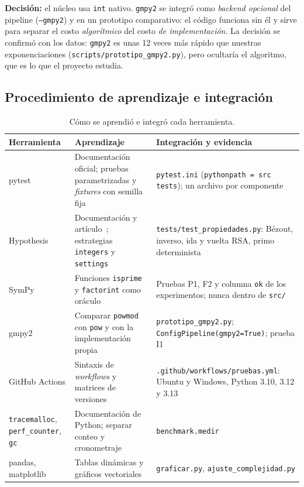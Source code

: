 \noindent\textbf{Decisión:} el núcleo usa \texttt{int} nativo. \texttt{gmpy2}
se integró como \emph{backend opcional} del pipeline (\texttt{--gmpy2}) y en un
prototipo comparativo: el código funciona sin él y sirve para separar el costo
\emph{algorítmico} del costo \emph{de implementación}. La decisión se confirmó
con los datos: \texttt{gmpy2} es unas 12 veces más rápido que nuestras
exponenciaciones (\texttt{scripts/prototipo\_gmpy2.py}), pero ocultaría el algoritmo,
que es lo que el proyecto estudia.

\subsection{Procedimiento de aprendizaje e integración}

\begin{table}[H]
\centering\small
\caption{Cómo se aprendió e integró cada herramienta.}
\begin{tabularx}{\textwidth}{@{}l Y Y@{}}
\toprule
\textbf{Herramienta} & \textbf{Aprendizaje} & \textbf{Integración y evidencia}\\
\midrule
pytest & Documentación oficial; pruebas parametrizadas y \emph{fixtures} con semilla fija & \texttt{pytest.ini} (\texttt{pythonpath = src tests}); un archivo por componente\\
Hypothesis & Documentación y artículo~\cite{hypothesis}; estrategias \texttt{integers} y \texttt{settings} & \texttt{tests/\allowbreak test\_propiedades.py}: Bézout, inverso, ida y vuelta RSA, primo determinista\\
SymPy & Funciones \texttt{isprime} y \texttt{factorint} como oráculo & Pruebas P1, F2 y columna \texttt{ok} de los experimentos; nunca dentro de \texttt{src/}\\
gmpy2 & Comparar \texttt{powmod} con \texttt{pow} y con la implementación propia & \texttt{prototipo\_gmpy2.py}; \texttt{ConfigPipeline\allowbreak(gmpy2=True)}; prueba I1\\
GitHub Actions & Sintaxis de \emph{workflows} y matrices de versiones & \texttt{.github/\allowbreak workflows/\allowbreak pruebas.yml}: Ubuntu y Windows, Python 3.10, 3.12 y 3.13\\
\texttt{tracemalloc}, \texttt{perf\_counter}, \texttt{gc} & Documentación de Python; separar conteo y cronometraje & \texttt{benchmark.medir}\\
pandas, matplotlib & Tablas dinámicas y gráficos vectoriales & \texttt{graficar.py}, \texttt{ajuste\_complejidad.py}\\
\bottomrule
\end{tabularx}
\end{table}


